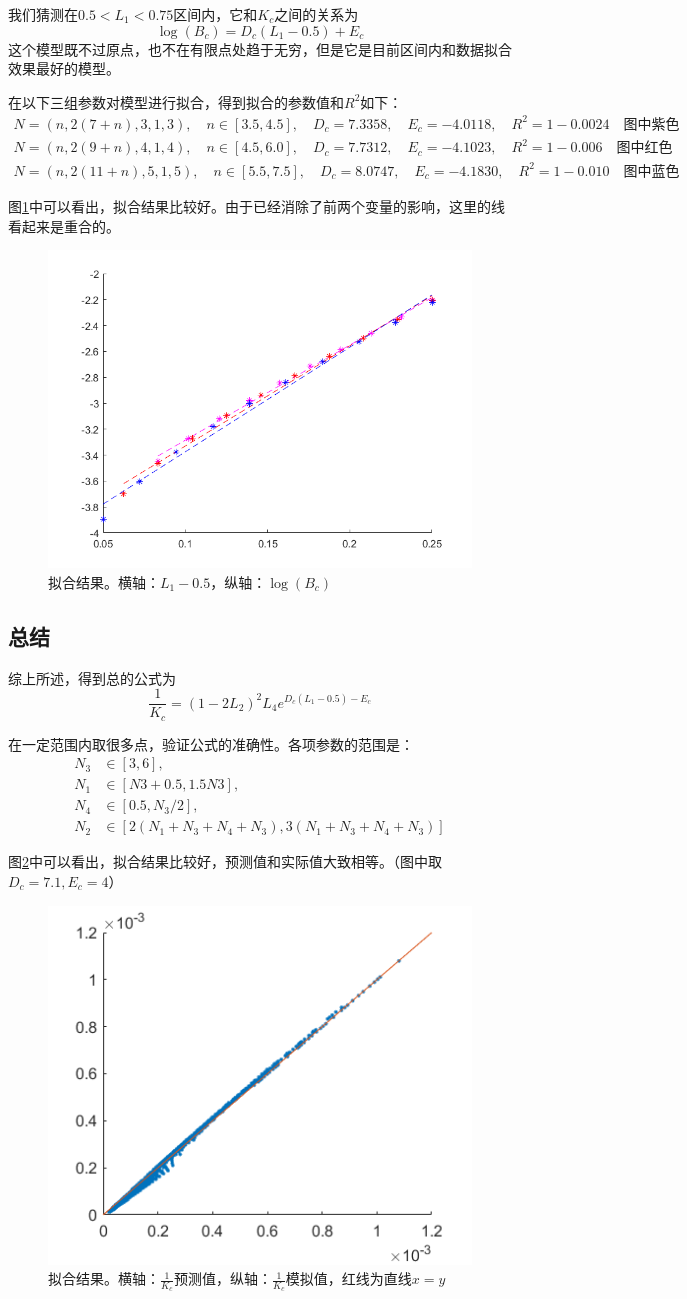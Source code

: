 \documentclass[12pt,a4paper]{article}
\begin{document}
我们猜测在$0.5 < L_1 < 0.75$区间内，它和$K_c$之间的关系为
$$ \log(B_c) = D_c (L_1 - 0.5) + E_c $$
这个模型既不过原点，也不在有限点处趋于无穷，但是它是目前区间内和数据拟合效果最好的模型。

在以下三组参数对模型进行拟合，得到拟合的参数值和$R^2$如下：
\begin{align*}
N=(n, 2(7+n), 3, 1, 3), \quad n \in [3.5, 4.5], \quad D_c = 7.3358, \quad E_c = -4.0118, \quad R^2 = 1 - 0.0024 \quad \text{图中紫色} \\
N=(n, 2(9+n), 4, 1, 4), \quad n \in [4.5, 6.0], \quad D_c = 7.7312, \quad E_c = -4.1023, \quad R^2 = 1 - 0.006 \quad \text{图中红色} \\
N=(n, 2(11+n), 5, 1, 5), \quad n \in [5.5, 7.5], \quad D_c = 8.0747, \quad E_c = -4.1830, \quad R^2 = 1 - 0.010 \quad \text{图中蓝色}
\end{align*}

图\ref{fn1}中可以看出，拟合结果比较好。由于已经消除了前两个变量的影响，这里的线看起来是重合的。
\begin{figure}[h]
\centering
\includegraphics[width=0.4\linewidth]{L1Bc}
\caption{拟合结果。横轴：$L_1 - 0.5$，纵轴：$\log(B_c)$}
\label{fn1}
\end{figure}

\subsection*{总结}

综上所述，得到总的公式为
$$ \frac{1}{K_c} = (1-2L_2)^2 L_4 e^{D_c(L_1 - 0.5) - E_c} $$

在一定范围内取很多点，验证公式的准确性。各项参数的范围是：
\begin{align*}
N_3 & \in [3, 6], \\
N_1 & \in [N3+0.5, 1.5 N3],\\
N_4 & \in [0.5, N_3/2], \\
N_2 & \in [2(N_1+N_3+N_4+N_3), 3(N_1+N_3+N_4+N_3)]
\end{align*}

图\ref{fna}中可以看出，拟合结果比较好，预测值和实际值大致相等。（图中取$D_c=7.1, E_c=4$）
\begin{figure}[h]
\centering
\includegraphics[width=0.4\linewidth]{LaKc}
\caption{拟合结果。横轴：$\frac{1}{K_c}$预测值，纵轴：$\frac{1}{K_c}$模拟值，红线为直线$x=y$}
\label{fna}
\end{figure}
\end{document}
